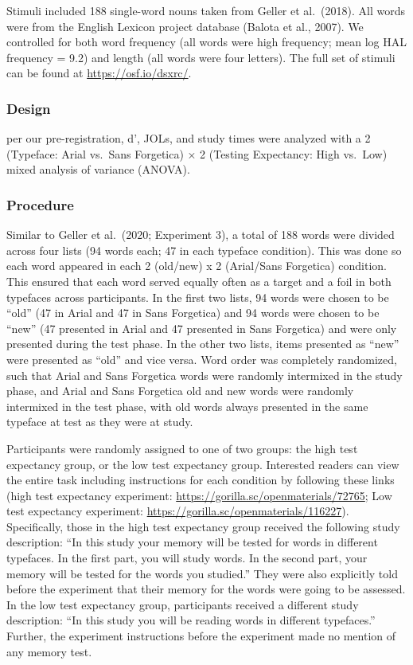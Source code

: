 \documentclass[
  english,
  jou]{apa7}
\begin{document}
Stimuli included 188 single-word nouns taken from Geller et al.~(2018). All words were from the English Lexicon project database (Balota et al., 2007). We controlled for both word frequency (all words were high frequency; mean log HAL frequency = 9.2) and length (all words were four letters). The full set of stimuli can be found at \url{https://osf.io/dsxrc/}.

\hypertarget{design}{%
\subsubsection{Design}\label{design}}

per our pre-registration, d', JOLs, and study times were analyzed with a 2 (Typeface: Arial vs.~Sans Forgetica) × 2 (Testing Expectancy: High vs.~Low) mixed analysis of variance (ANOVA).

\hypertarget{procedure}{%
\subsubsection{Procedure}\label{procedure}}

Similar to Geller et al.~(2020; Experiment 3), a total of 188 words were divided across four lists (94 words each; 47 in each typeface condition). This was done so each word appeared in each 2 (old/new) x 2 (Arial/Sans Forgetica) condition. This ensured that each word served equally often as a target and a foil in both typefaces across participants. In the first two lists, 94 words were chosen to be ``old'' (47 in Arial and 47 in Sans Forgetica) and 94 words were chosen to be ``new'' (47 presented in Arial and 47 presented in Sans Forgetica) and were only presented during the test phase. In the other two lists, items presented as ``new'' were presented as ``old'' and vice versa. Word order was completely randomized, such that Arial and Sans Forgetica words were randomly intermixed in the study phase, and Arial and Sans Forgetica old and new words were randomly intermixed in the test phase, with old words always presented in the same typeface at test as they were at study.

Participants were randomly assigned to one of two groups: the high test expectancy group, or the low test expectancy group. Interested readers can view the entire task including instructions for each condition by following these links (high test expectancy experiment: \url{https://gorilla.sc/openmaterials/72765}; Low test expectancy experiment: \url{https://gorilla.sc/openmaterials/116227}). Specifically, those in the high test expectancy group received the following study description: ``In this study your memory will be tested for words in different typefaces. In the first part, you will study words. In the second part, your memory will be tested for the words you studied.'' They were also explicitly told before the experiment that their memory for the words were going to be assessed. In the low test expectancy group, participants received a different study description: ``In this study you will be reading words in different typefaces.'' Further, the experiment instructions before the experiment made no mention of any memory test.
\end{document}
